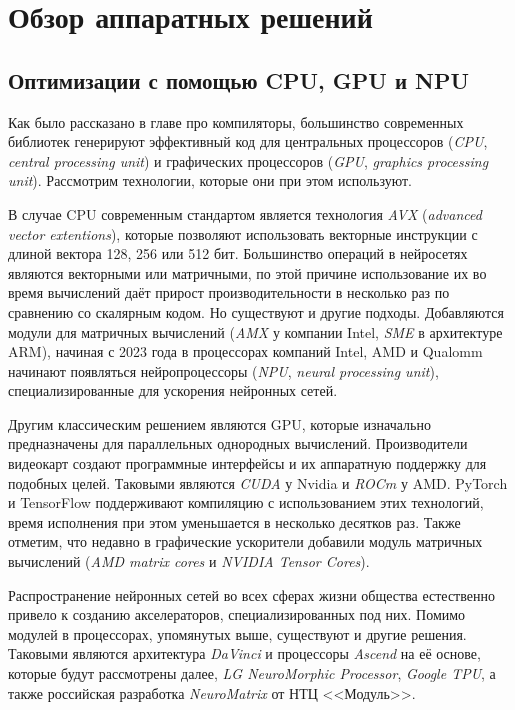 \section{Обзор аппаратных решений}
\label{sec:Architecture} 

\subsection{Оптимизации с помощью CPU, GPU и NPU}

Как было рассказано в главе про компиляторы, большинство современных библиотек
генерируют эффективный код для центральных процессоров (\textit{CPU},
\textit{central processing unit}) и графических процессоров (\textit{GPU},
\textit{graphics processing unit}). Рассмотрим технологии, которые они при
этом используют.

В случае CPU современным стандартом является технология \textit{AVX} \cite{intel}
(\textit{advanced vector extentions}), которые позволяют использовать векторные
инструкции с длиной вектора 128, 256 или 512 бит. Большинство операций в
нейросетях являются векторными или матричными, по этой причине использование
их во время вычислений даёт прирост производительности в несколько раз по
сравнению со скалярным кодом. Но существуют и другие подходы. Добавляются
модули для матричных вычислений (\textit{AMX} \cite{intel} у компании Intel, 
\textit{SME} \cite{arm} в
архитектуре ARM), начиная с 2023 года в процессорах компаний Intel, AMD и
Qualomm начинают появляться нейропроцессоры (\textit{NPU},
\textit{neural processing unit}), специализированные для ускорения нейронных
сетей.

Другим классическим решением являются GPU, которые изначально предназначены
для параллельных однородных вычислений. Производители видеокарт создают
программные интерфейсы и их аппаратную поддержку для подобных целей. Таковыми
являются \textit{CUDA} \cite{cuda} у Nvidia и \textit{ROCm} \cite{rocm}
у AMD. PyTorch и TensorFlow
поддерживают компиляцию с использованием этих технологий, время исполнения при
этом уменьшается в несколько десятков раз. Также отметим, что недавно в
графические ускорители добавили модуль матричных вычислений
(\textit{AMD matrix cores} и \textit{NVIDIA Tensor Cores}).

Распространение нейронных сетей во всех сферах жизни общества естественно
привело к созданию акселераторов, специализированных под них. Помимо модулей
в процессорах, упомянутых выше, существуют и другие решения. Таковыми являются
архитектура \textit{DaVinci} и процессоры \textit{Ascend} на её основе, которые
будут рассмотрены далее, \textit{LG NeuroMorphic Processor},
\textit{Google TPU}, а также российская разработка \textit{NeuroMatrix} от
НТЦ <<Модуль>>.

